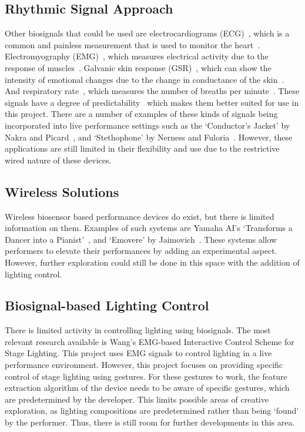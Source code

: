 \subsection{Rhythmic Signal Approach}
Other biosignals that could be used are electrocardiograms (ECG)~\cite{Afonso:1999}\cite{Pan:1985},
which is a common and painless measurement that is used to monitor the heart~\cite{Mayo:2023}.
Electromyography (EMG)~\cite{Tanaka:2002}\cite{Young:2013},
which measures electrical activity due to the response of muscles~\cite{Hopkins:2023}.
Galvanic skin response (GSR)~\cite{Kurniawan:2013},
which can show the intensity of emotional changes due to the change in conductance of the skin~\cite{Farnsworth:2018}.
And respiratory rate~\cite{Carlos:2011},
which measures the number of breaths per minute~\cite{Hopkins2:2023}.
These signals have a degree of predictability~\cite{Tahiroğlu:2008} which makes them better suited for use in this project.
There are a number of examples of these kinds of signals being incorporated into live performance settings such as
the `Conductor's Jacket' by Nakra and Picard~\cite{Nakra:1998}, and `Stethophone' by Nerness and Fuloria~\cite{Nerness:2019}.
However, these applications are still limited in their flexibility and use due to the restrictive wired nature of these devices.


\subsection{Wireless Solutions}
Wireless biosensor based performance devices do exist, but there is limited information on them.
Examples of such systems are Yamaha AI's `Transforms a Dancer into a Pianist'~\cite{Yamaha:2018}, and `Emovere' by Jaimovich~\cite{Jaimovich:2016}.
These systems allow performers to elevate their performances by adding an experimental aspect.
However, further exploration could still be done in this space with the addition of lighting control.

\subsection{Biosignal-based Lighting Control}
There is limited activity in controlling lighting using biosignals.
The most relevant research available is Wang's EMG-based Interactive Control Scheme for Stage Lighting\cite{Wang:2022}.
This project uses EMG signals to control lighting in a live performance environment.
However, this project focuses on providing specific control of stage lighting using gestures.
For these gestures to work, the feature extraction algorithm of the device needs to be aware of specific gestures, which are predetermined by the developer.
This limits possible areas of creative exploration, as lighting compositions are predetermined rather than being `found' by the performer.
Thus, there is still room for further developments in this area.

